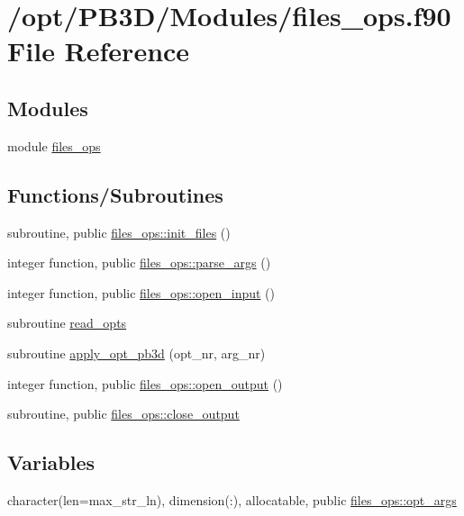 \hypertarget{files__ops_8f90}{}\section{/opt/\+P\+B3\+D/\+Modules/files\+\_\+ops.f90 File Reference}
\label{files__ops_8f90}
\subsection*{Modules}
\begin{DoxyCompactItemize}
\item 
module \hyperlink{namespacefiles__ops}{files\+\_\+ops}
\end{DoxyCompactItemize}
\subsection*{Functions/\+Subroutines}
\begin{DoxyCompactItemize}
\item 
subroutine, public \hyperlink{namespacefiles__ops_a1e219b1147f109f758d03bef89d540e8}{files\+\_\+ops\+::init\+\_\+files} ()
\item 
integer function, public \hyperlink{namespacefiles__ops_a051584112f6e4f6e60b0ef824dffbf5e}{files\+\_\+ops\+::parse\+\_\+args} ()
\item 
integer function, public \hyperlink{namespacefiles__ops_a63a81a5a451f787025429878b2cec81b}{files\+\_\+ops\+::open\+\_\+input} ()
\item 
subroutine \hyperlink{files__ops_8f90_ab06139d4caa922a90cef467aa6cf2cba}{read\+\_\+opts}
\item 
subroutine \hyperlink{files__ops_8f90_a0aab73e3be6acf8b28310674ffabb246}{apply\+\_\+opt\+\_\+pb3d} (opt\+\_\+nr, arg\+\_\+nr)
\item 
integer function, public \hyperlink{namespacefiles__ops_ad681a9e8083a6f664cf0f9d17ebe279c}{files\+\_\+ops\+::open\+\_\+output} ()
\item 
subroutine, public \hyperlink{namespacefiles__ops_a09c55ba39a79fd1e1d9d8af2e08f41cb}{files\+\_\+ops\+::close\+\_\+output}
\end{DoxyCompactItemize}
\subsection*{Variables}
\begin{DoxyCompactItemize}
\item 
character(len=max\+\_\+str\+\_\+ln), dimension(\+:), allocatable, public \hyperlink{namespacefiles__ops_a0666bcbf3aa6a9969e6dc563a40e7152}{files\+\_\+ops\+::opt\+\_\+args}
\end{DoxyCompactItemize}


